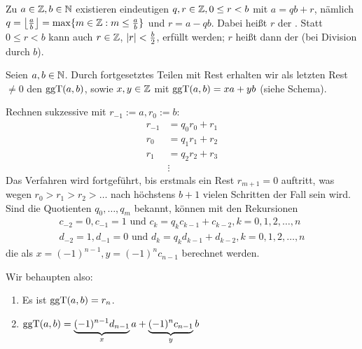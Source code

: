 \begin{satz}
	Zu $a \in \ZZ, b \in \NN$ existieren eindeutigen $q,r \in \ZZ, 0 \leq r < b$ mit $a = qb + r$, nämlich $q = \floor*{\frac{a}{b}} = \max\{m \in \ZZ : m \leq \frac{a}{b}\}$ und $r = a-qb$. Dabei heißt $r$ der . Statt $0 \leq r < b$ kann auch $r \in \ZZ$, $\abs{r} < \frac{b}{2}$, erfüllt werden; $r$ heißt dann der  (bei Division durch $b$).   
\end{satz}

\begin{satz}
\label{satz_ea}
	Seien $a,b \in \NN$. Durch fortgesetztes Teilen mit Rest erhalten wir als letzten Rest $\neq 0$ den $\ggT(a,b)$, sowie $x,y \in \ZZ$ mit $\ggT(a,b) = xa + yb$ (siehe Schema). 
\end{satz}

	Rechnen sukzessive mit $r_{-1} := a, r_0 :=b$:
	\begin{equation}
	\begin{aligned}
		r_{-1} &= q_0 r_0 + r_1 \\
		r_0 &= q_1 r_1 + r_2 \\
		r_1 &= q_2 r_2 + r_3 \\
		&\vdots
	\end{aligned}
	\end{equation}
	Das Verfahren wird fortgeführt, bis erstmals ein Rest $r_{m+1} = 0$ auftritt, was wegen $r_0 > r_1 > r_2 > \dots$ nach höchstens $b + 1$ vielen Schritten der Fall sein wird. Sind die Quotienten $q_0, \dots, q_m$ bekannt, können mit den Rekursionen \[
	\begin{array}{c}
		c_{-2} = 0, c_{-1} = 1 \text{ und } c_k = q_k c_{k-1} + c_{k-2}, k=0,1,2, \dots, n \\
		d_{-2} = 1, d_{-1} = 0 \text{ und } d_k = q_k d_{k-1} + d_{k-2}, k=0,1,2, \dots, n
	\end{array} \]
	die  als $x = (-1)^{n-1}, y=(-1)^n c_{n-1}$ berechnet werden.
	
	Wir behaupten also: \begin{enumerate}[(1)]
		\item Es ist $\ggT(a,b) = r_n$.
		\item $\ggT(a,b) = \underbrace{(-1)^{n-1} d_{n-1}}_{x} a + \underbrace{(-1)^n c_{n-1}}_{y} b$
	\end{enumerate}


